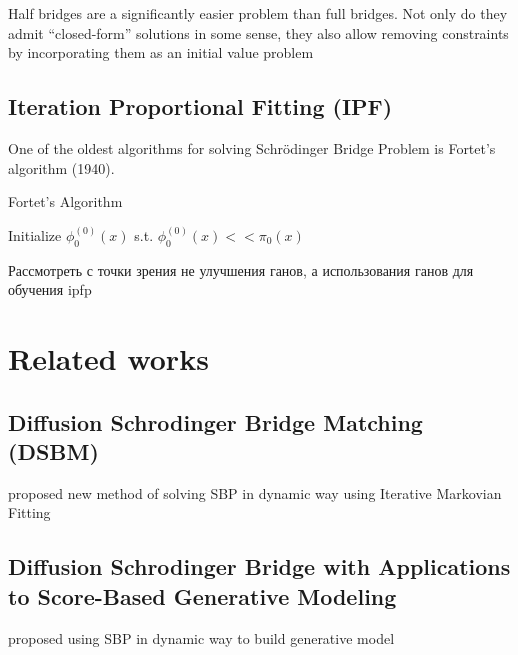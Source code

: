 \documentclass{article}
\begin{document}
Half bridges are a significantly easier problem than full bridges. Not only do they admit “closed-form” solutions in some sense, they also allow removing constraints by incorporating them as an initial value problem
\subsection{Iteration Proportional Fitting (IPF)}
One of the oldest algorithms for solving Schrödinger Bridge Problem is Fortet's algorithm (1940).

\begin{algorithm}
\caption{Fortet's Algorithm}\label{alg:fortret}
Initialize $\phi_0^{(0)}(x)$ s.t. $\phi_0^{(0)}(x)<<\pi_0(x)$\;
\end{algorithm}

Рассмотреть с точки зрения не улучшения ганов, а использования ганов для обучения ipfp

\section{Related works}
\subsection{Diffusion Schrodinger Bridge Matching (DSBM)}
\citet{dsbm}  proposed new method of solving SBP in dynamic way using Iterative Markovian Fitting
\subsection{Diffusion Schrodinger Bridge with Applications to Score-Based Generative Modeling}
\citet{dsb} proposed using SBP in dynamic way to build generative model


% 


\end{document}
